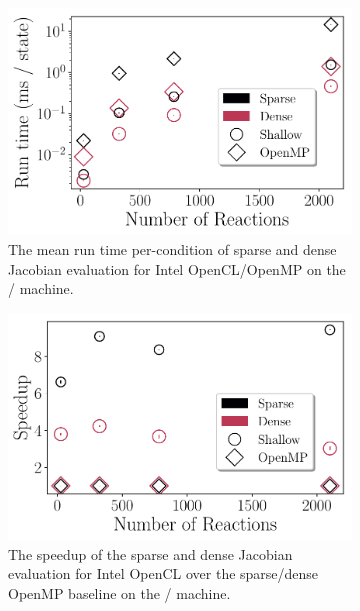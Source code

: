\documentclass[12pt,number,sort&compress,preprint]{elsarticle}
\begin{document}
\begin{figure}[htbp]
   \centering
  \begin{subfigure}[t]{0.48\linewidth}
      \includegraphics[width=\textwidth]{sparse_vs_dense.pdf}
      \caption{The mean run time per-condition of sparse and dense Jacobian evaluation for Intel OpenCL\slash OpenMP on the \avx/ machine.}
      \label{F:sparse_vs_dense}
  \end{subfigure}
  \hfill
  \begin{subfigure}[t]{0.48\linewidth}
      \includegraphics[width=\textwidth]{sparse_vs_dense_speedup.pdf}
      \caption{The speedup of the sparse and dense Jacobian evaluation for Intel OpenCL over the sparse\slash dense OpenMP baseline on the \avx/ machine.}
      \label{F:sparse_vs_dense_speedup}
  \end{subfigure}
  \\
  \begin{subfigure}[t]{0.48\linewidth}

\end{subfigure}
\end{figure}
\end{document}

